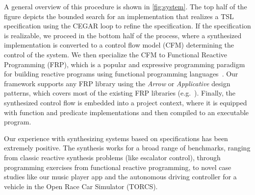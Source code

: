 

A general overview of this procedure is shown in \cref{fig:system}.
The top half of the figure depicts the bounded search for an
implementation that realizes a TSL specification using the CEGAR loop to
refine the specification. If the specification is realizable, we
proceed in the bottom half of the process, where a synthesized
implementation is converted to a control flow model (CFM) determining
the control of the system. We then specialize the CFM to Functional
Reactive Programming (FRP), which is a popular and expressive
programming paradigm for building reactive programs using functional
programming languages~\cite{hudakFRAN}. Our framework supports any FRP
library using the \textit{Arrow} or \textit{Applicative} design patterns, which covers
most of the existing FRP libraries
(e.g.~\cite{reactivebanana,clash2015,courtney2003yampa,perez2016yampa}).
Finally, the synthesized control flow is embedded into a project
context, where it is equipped with function and predicate
implementations and then compiled to an executable program.

Our experience with synthesizing systems based on \TSL specifications has been extremely positive. The synthesis works
for a broad range of benchmarks, ranging from classic reactive synthesis
problems (like escalator control), through programming exercises
from functional reactive programming, to novel
case studies like our music player app and the autonomous driving
controller for a vehicle in the Open Race Car Simulator (TORCS).
